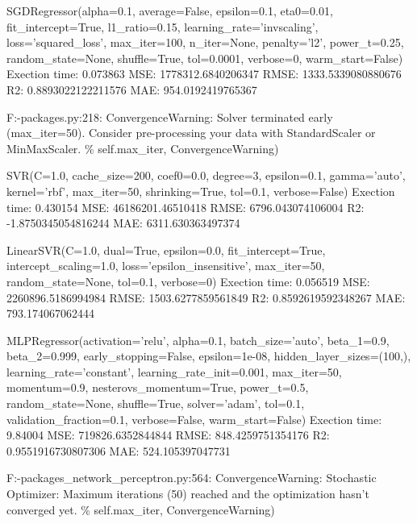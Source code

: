 \documentclass[11pt]{article}
\begin{document}
SGDRegressor(alpha=0.1, average=False, epsilon=0.1, eta0=0.01,
fit\_intercept=True, l1\_ratio=0.15, learning\_rate='invscaling',
loss='squared\_loss', max\_iter=100, n\_iter=None, penalty='l2',
power\_t=0.25, random\_state=None, shuffle=True, tol=0.0001, verbose=0,
warm\_start=False) Exection time: 0.073863 MSE: 1778312.6840206347 RMSE:
1333.5339080880676 R2: 0.8893022122211576 MAE: 954.0192419765367

F:\Users\ncksd{}\lib\site-packages\sklearn\svm\base.py:218:
ConvergenceWarning: Solver terminated early (max\_iter=50). Consider
pre-processing your data with StandardScaler or MinMaxScaler. \%
self.max\_iter, ConvergenceWarning)

SVR(C=1.0, cache\_size=200, coef0=0.0, degree=3, epsilon=0.1,
gamma='auto', kernel='rbf', max\_iter=50, shrinking=True, tol=0.1,
verbose=False) Exection time: 0.430154 MSE: 46186201.46510418 RMSE:
6796.043074106004 R2: -1.8750345054816244 MAE: 6311.630363497374

LinearSVR(C=1.0, dual=True, epsilon=0.0, fit\_intercept=True,
intercept\_scaling=1.0, loss='epsilon\_insensitive', max\_iter=50,
random\_state=None, tol=0.1, verbose=0) Exection time: 0.056519 MSE:
2260896.5186994984 RMSE: 1503.6277859561849 R2: 0.8592619592348267 MAE:
793.174067062444

MLPRegressor(activation='relu', alpha=0.1, batch\_size='auto',
beta\_1=0.9, beta\_2=0.999, early\_stopping=False, epsilon=1e-08,
hidden\_layer\_sizes=(100,), learning\_rate='constant',
learning\_rate\_init=0.001, max\_iter=50, momentum=0.9,
nesterovs\_momentum=True, power\_t=0.5, random\_state=None,
shuffle=True, solver='adam', tol=0.1, validation\_fraction=0.1,
verbose=False, warm\_start=False) Exection time: 9.84004 MSE:
719826.6352844844 RMSE: 848.4259751354176 R2: 0.9551916730807306 MAE:
524.105397047731

F:\Users\ncksd{}\lib\site-packages\sklearn\neural\_network\multilayer\_perceptron.py:564:
ConvergenceWarning: Stochastic Optimizer: Maximum iterations (50)
reached and the optimization hasn't converged yet. \% self.max\_iter,
ConvergenceWarning)


    
    
    
    
\end{document}
